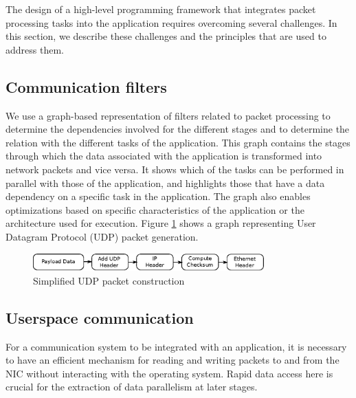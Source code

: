 \documentclass[10pt, conference, compsocconf, reqno]{IEEEtran}
\newcommand{\comment}[1]{}
\begin{document}
The design of a high-level programming framework that integrates packet processing tasks into the application requires overcoming several challenges. \comment{The entire system is driven by the extent to which parallelism can be extracted. Some of the techniques that can be applied to the packet processing tasks can be used for the tasks related to the application.} In this section, we describe these challenges and the principles that are used to address them. \comment{We focus on the methodologies related to the packet processing tasks and the parallel processing engine itself.}

\subsection{Communication filters}

\comment{Understanding the set of packet processing tasks associated with the application is essential to performing them in parallel.} We use a graph-based representation of filters related to packet processing to determine the dependencies involved for the different stages and to determine the relation with the different tasks of the application. This graph contains the stages through which the data associated with the application is transformed into network packets and vice versa. It shows which of the tasks can be performed in parallel with those of the application, and highlights those that have a data dependency on a specific task in the application. The graph also enables optimizations based on specific characteristics of the application or the architecture used for execution. Figure \ref{fig2} shows a graph representing User Datagram Protocol (UDP) packet generation.

\begin{figure}[ht]
\centering
\includegraphics[width=3.5in]{pack-op}
\caption{Simplified UDP packet construction}
\label{fig2}
\end{figure}

\subsection{Userspace communication}

For a communication system to be integrated with an application, it is necessary to have an efficient mechanism for reading and writing packets to and from the NIC without interacting with the operating system. Rapid data access here is crucial for the extraction of data parallelism at later stages. \comment{In using the techniques described below we exploit the modern NIC architecture to its full potential.}
\end{document}
